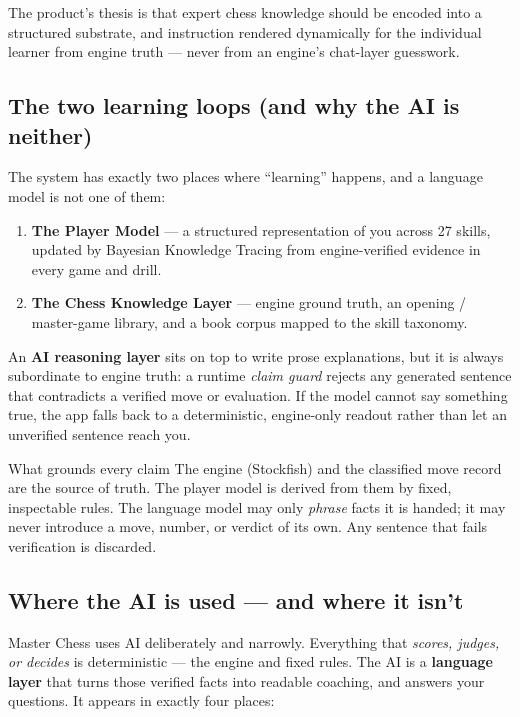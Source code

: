 \documentclass[11pt]{article}
\begin{document}
The product's thesis is that expert chess knowledge should be encoded into a
structured substrate, and instruction rendered dynamically for the individual
learner from engine truth --- never from an engine's chat-layer guesswork.

\subsection{The two learning loops (and why the AI is neither)}

The system has exactly two places where ``learning'' happens, and a language
model is not one of them:

\begin{enumerate}[leftmargin=1.4em, itemsep=2pt]
  \item \textbf{The Player Model} --- a structured representation of you across
  27 skills, updated by Bayesian Knowledge Tracing from engine-verified
  evidence in every game and drill.
  \item \textbf{The Chess Knowledge Layer} --- engine ground truth, an
  opening / master-game library, and a book corpus mapped to the skill
  taxonomy.
\end{enumerate}

An \textbf{AI reasoning layer} sits on top to write prose explanations, but it
is always subordinate to engine truth: a runtime \emph{claim guard} rejects any
generated sentence that contradicts a verified move or evaluation. If the model
cannot say something true, the app falls back to a deterministic, engine-only
readout rather than let an unverified sentence reach you.

\begin{rulebox}{What grounds every claim}
The engine (Stockfish) and the classified move record are the source of truth.
The player model is derived from them by fixed, inspectable rules. The language
model may only \emph{phrase} facts it is handed; it may never introduce a move,
number, or verdict of its own. Any sentence that fails verification is
discarded.
\end{rulebox}

\subsection{Where the AI is used --- and where it isn't}\label{sec:ai}

Master Chess uses AI deliberately and narrowly. Everything that \emph{scores,
judges, or decides} is deterministic --- the engine and fixed rules. The AI is a
\textbf{language layer} that turns those verified facts into readable coaching,
and answers your questions. It appears in exactly four places:
\end{document}
